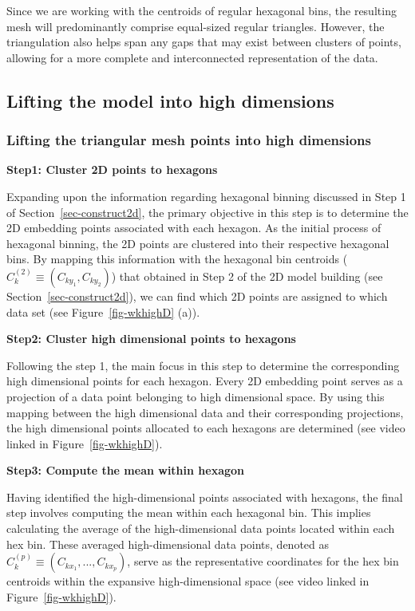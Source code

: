 \documentclass[
  12pt]{article}
\begin{document}
Since we are working with the centroids of regular hexagonal bins, the
resulting mesh will predominantly comprise equal-sized regular
triangles. However, the triangulation also helps span any gaps that may
exist between clusters of points, allowing for a more complete and
interconnected representation of the data.

\hypertarget{lifting-the-model-into-high-dimensions}{%
\subsection{Lifting the model into high
dimensions}\label{lifting-the-model-into-high-dimensions}}

\hypertarget{lifting-the-triangular-mesh-points-into-high-dimensions}{%
\subsubsection{Lifting the triangular mesh points into high
dimensions}\label{lifting-the-triangular-mesh-points-into-high-dimensions}}

\textbf{Step1: Cluster 2D points to hexagons}

Expanding upon the information regarding hexagonal binning discussed in
Step 1 of Section~\ref{sec-construct2d}, the primary objective in this
step is to determine the 2D embedding points associated with each
hexagon. As the initial process of hexagonal binning, the 2D points are
clustered into their respective hexagonal bins. By mapping this
information with the hexagonal bin centroids
(\(C_k^{(2)} \equiv (C_{ky_1}, C_{ky_2})\)) that obtained in Step 2 of
the 2D model building (see Section~\ref{sec-construct2d}), we can find
which 2D points are assigned to which data set (see
Figure~\ref{fig-wkhighD} (a)).

\textbf{Step2: Cluster high dimensional points to hexagons}

Following the step 1, the main focus in this step to determine the
corresponding high dimensional points for each hexagon. Every 2D
embedding point serves as a projection of a data point belonging to high
dimensional space. By using this mapping between the high dimensional
data and their corresponding projections, the high dimensional points
allocated to each hexagons are determined (see video linked in
Figure~\ref{fig-wkhighD}).

\textbf{Step3: Compute the mean within hexagon}

Having identified the high-dimensional points associated with hexagons,
the final step involves computing the mean within each hexagonal bin.
This implies calculating the average of the high-dimensional data points
located within each hex bin. These averaged high-dimensional data
points, denoted as \(C_k^{(p)} \equiv (C_{kx_1}, ..., C_{kx_p})\), serve
as the representative coordinates for the hex bin centroids within the
expansive high-dimensional space (see video linked in
Figure~\ref{fig-wkhighD}).
\end{document}
